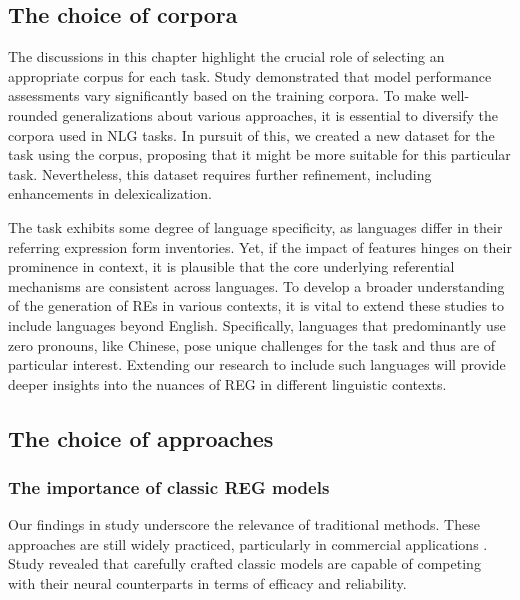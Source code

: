 \subsection{The choice of corpora} 

\begin{description}[leftmargin=0cm]
	\item[A need for corpus diversification.] The discussions in this chapter highlight the crucial role of selecting an appropriate corpus for each task. Study \studF demonstrated that model performance assessments vary significantly based on the training corpora. To make well-rounded generalizations about various approaches, it is essential to diversify the corpora used in NLG tasks. In pursuit of this, we created a new dataset for the \context task using the \wsj corpus, proposing that it might be more suitable for this particular task. Nevertheless, this dataset requires further refinement, including enhancements in delexicalization. 
	
	\item[Inclusion of more languages.] The \context task exhibits some degree of language specificity, as languages differ in their referring expression form inventories. Yet, if the impact of features hinges on their prominence in context, it is plausible that the core underlying referential mechanisms are consistent across languages. To develop a broader understanding of the generation of REs in various contexts, it is vital to extend these studies to include languages beyond English. Specifically, languages that predominantly use zero pronouns, like Chinese, pose unique challenges for the \context task and thus are of particular interest. Extending our research to include such languages will provide deeper insights into the nuances of REG in different linguistic contexts.
	
\end{description} 

\subsection{The choice of \context approaches} 
\subsubsection{The importance of classic REG models}
Our findings in study \studF underscore the relevance of traditional \context methods. These approaches are still widely practiced, particularly in commercial applications \citep{reiter-2017-commercial}. Study \studF revealed that carefully crafted classic models are capable of competing with their neural counterparts in terms of efficacy and reliability.

